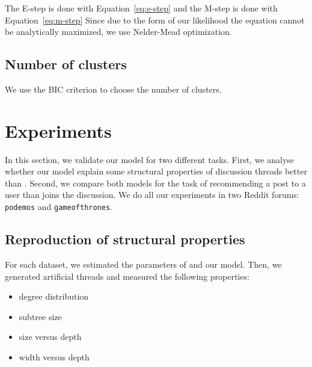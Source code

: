 \documentclass[smallextended]{svjour3}          %
\begin{document}
The E-step is done with Equation~\ref{eq:e-step} and the M-step is done with Equation~\ref{eq:m-step} Since due to the form of our likelihood the equation cannot be analytically maximized, we use Nelder-Mead optimization.

\subsection{Number of clusters}
We use the BIC criterion to choose the number of clusters.
\section{Experiments}
In this section, we validate our model for two different tasks. First, we analyse whether our model explain some structural properties of discussion threads better than \cite{Gomez2012}. Second, we compare both models for the task of recommending a post to a user than joins the discussion. We do all our experiments in two Reddit forums: \texttt{podemos} and \texttt{gameofthrones}.

\subsection{Reproduction of structural properties} 
For each dataset, we estimated the parameters of \citep{Gomez2012} and our model. Then, we generated artificial threads and measured the following properties:

\begin{itemize}
\item degree distribution
\item subtree size
\item size versus depth
\item width versus depth
\end{itemize} 
\end{document}
